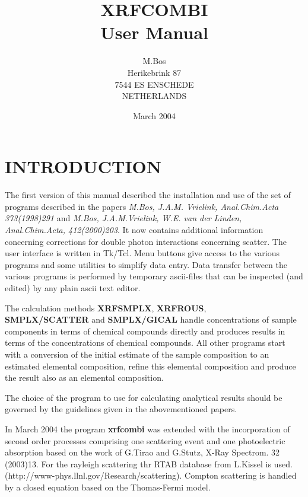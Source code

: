 \title{XRFCOMBI\\
User Manual}
\author{M.Bos\\
Herikebrink 87\\
7544 ES ENSCHEDE\\
NETHERLANDS}
\date{March 2004}

\maketitle
\section{INTRODUCTION}
The first version of this manual described the installation
 and use of the set of
programs described in the papers {\em M.Bos, J.A.M. Vrielink, Anal.Chim.Acta 373(1998)291}
   and 
{\em M.Bos, J.A.M.Vrielink, W.E. van der Linden,\\ Anal.Chim.Acta, 412(2000)203}.
 It now contains additional information concerning
corrections for double photon interactions concerning scatter.
 The user interface
is written in Tk/Tcl. Menu buttons give access to the various programs
and some utilities to simplify data entry. Data transfer between
the various programs is performed by temporary ascii-files that can be inspected
(and edited) by any plain ascii text editor.

The calculation methods {\bf XRFSMPLX}, {\bf XRFROUS},\\
 {\bf SMPLX/SCATTER} and
{\bf SMPLX/GICAL}  handle concentrations of
sample components in terms of chemical compounds directly and produces
results in terms of the concentrations of chemical compounds. All other
programs start with a conversion of the initial  estimate of the
sample composition to an estimated elemental composition, refine this
elemental composition and produce the result also as an elemental composition.

The choice of the program to use for calculating analytical results
should be governed by the guidelines given in the abovementioned papers.

In March 2004 the program {\bf xrfcombi} was extended with
 the incorporation of second order processes
comprising one scattering event and one photoelectric absorption based  
on the work of G.Tirao and G.Stutz, X-Ray Spectrom. 32 (2003)13.
For the rayleigh scattering thr RTAB database from L.Kissel is used.
(http://www-phys.llnl.gov/Research/scattering).
Compton scattering is handled by a closed equation based on the Thomas-Fermi
model.

